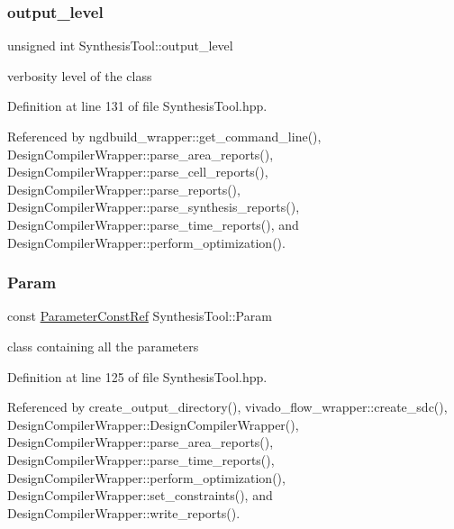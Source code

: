 \mbox{\label{classSynthesisTool_a58343bf9df295ca1734f28477c64373d}} 
\subsubsection{\texorpdfstring{output\+\_\+level}{output\_level}}
{\footnotesize\ttfamily unsigned int Synthesis\+Tool\+::output\+\_\+level\hspace{0.3cm}{\ttfamily [protected]}}



verbosity level of the class 



Definition at line 131 of file Synthesis\+Tool.\+hpp.



Referenced by ngdbuild\+\_\+wrapper\+::get\+\_\+command\+\_\+line(), Design\+Compiler\+Wrapper\+::parse\+\_\+area\+\_\+reports(), Design\+Compiler\+Wrapper\+::parse\+\_\+cell\+\_\+reports(), Design\+Compiler\+Wrapper\+::parse\+\_\+reports(), Design\+Compiler\+Wrapper\+::parse\+\_\+synthesis\+\_\+reports(), Design\+Compiler\+Wrapper\+::parse\+\_\+time\+\_\+reports(), and Design\+Compiler\+Wrapper\+::perform\+\_\+optimization().

\mbox{\label{classSynthesisTool_a854ef102782ff4d069e1aa6d1a94d64e}} 
\subsubsection{\texorpdfstring{Param}{Param}}
{\footnotesize\ttfamily const \hyperlink{Parameter_8hpp_a37841774a6fcb479b597fdf8955eb4ea}{Parameter\+Const\+Ref} Synthesis\+Tool\+::\+Param\hspace{0.3cm}{\ttfamily [protected]}}



class containing all the parameters 



Definition at line 125 of file Synthesis\+Tool.\+hpp.



Referenced by create\+\_\+output\+\_\+directory(), vivado\+\_\+flow\+\_\+wrapper\+::create\+\_\+sdc(), Design\+Compiler\+Wrapper\+::\+Design\+Compiler\+Wrapper(), Design\+Compiler\+Wrapper\+::parse\+\_\+area\+\_\+reports(), Design\+Compiler\+Wrapper\+::parse\+\_\+time\+\_\+reports(), Design\+Compiler\+Wrapper\+::perform\+\_\+optimization(), Design\+Compiler\+Wrapper\+::set\+\_\+constraints(), and Design\+Compiler\+Wrapper\+::write\+\_\+reports().

